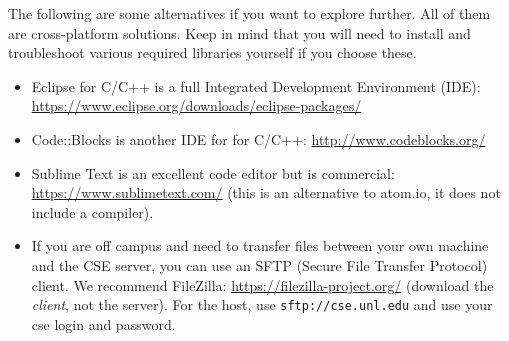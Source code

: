 \documentclass[12pt]{scrartcl}
\begin{document}
The following are some alternatives if you want to explore further.
All of them are cross-platform solutions.  Keep in mind that you will
need to install and troubleshoot various required libraries yourself if
you choose these.
\begin{itemize} 
  \item Eclipse for C/C++ is a full Integrated Development Environment (IDE):
  \url{https://www.eclipse.org/downloads/eclipse-packages/}
  \item Code::Blocks is another IDE for for C/C++: \url{http://www.codeblocks.org/}
  \item Sublime Text is an excellent code editor but is commercial: \url{https://www.sublimetext.com/} (this is an alternative to atom.io, it does not include
  a compiler).
  \item If you are off campus and need to transfer files between your 
  own machine and the CSE server, you can use an SFTP (Secure File Transfer
  Protocol) client.  We recommend FileZilla: \url{https://filezilla-project.org/}
  (download the \emph{client}, not the server).  For the host, use 
  \texttt{sftp://cse.unl.edu} and use your cse login and password.
\end{itemize}


  
\end{document}
